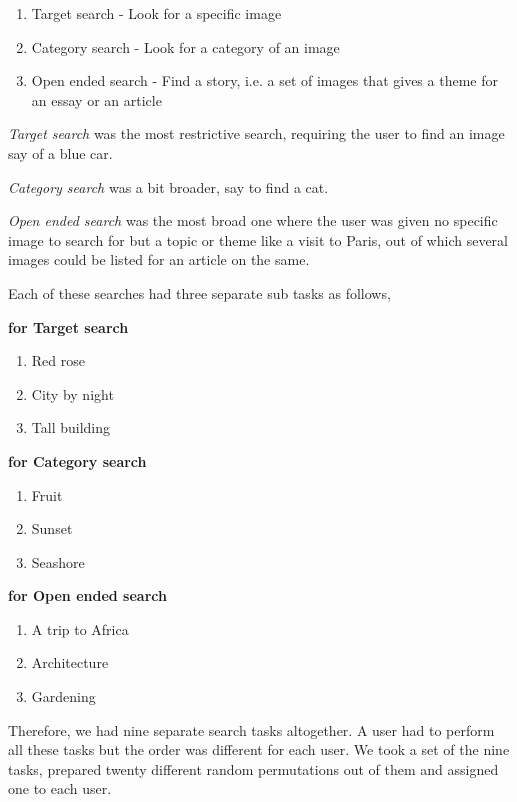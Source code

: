 \documentclass[english]{tktltiki}
\begin{document}
\begin{enumerate}
  \item Target search - Look for a specific image
  \item Category search - Look for a category of an image
  \item Open ended search - Find a story, i.e. a set of images that gives a theme for an essay or an article
\end{enumerate}

\textit{Target search} was the most restrictive search, requiring the user to find an image say of a blue car.

\textit{Category search} was a bit broader, say to find a cat.

\textit{Open ended search} was the most broad one where the user was given no specific image to search for but a topic or theme like a visit to Paris, out of which several images could be listed for an article on the same.

Each of these searches had three separate sub tasks as follows,

\textbf{for Target search}

\begin{enumerate}
  \item Red rose
  \item City by night
  \item Tall building
\end{enumerate}

\textbf{for Category search}

\begin{enumerate}
  \item Fruit
  \item Sunset
  \item Seashore
\end{enumerate}

\textbf{for Open ended search}

\begin{enumerate}
  \item A trip to Africa
  \item Architecture
  \item Gardening
\end{enumerate}

Therefore, we had nine separate search tasks altogether. A user had to perform all these tasks but the order was different for each user. We took a set of the nine tasks, prepared twenty different random permutations out of them and assigned one to each user.
\end{document}
